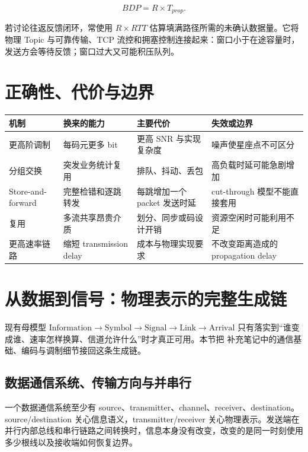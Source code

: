 \documentclass[UTF8,fontset=none,11pt,a4paper]{ctexart}
\begin{document}
\[
BDP=R\times T_{prop}.
\]

若讨论往返反馈闭环，常使用 \(R\times RTT\)
估算填满路径所需的未确认数据量。它将物理 Topic 与可靠传输、TCP
流控和拥塞控制连接起来：窗口小于在途容量时，发送方会等待反馈；窗口过大又可能积压队列。

\section{正确性、代价与边界}\label{8-ux6b63ux786eux6027ux4ee3ux4ef7ux4e0eux8fb9ux754c}

\begin{longtable}[]{@{}llll@{}}
\toprule\noalign{}
机制 & 换来的能力 & 主要代价 & 失效或边界 \\
\midrule\noalign{}
\endhead
\bottomrule\noalign{}
\endlastfoot
更高阶调制 & 每码元更多 bit & 更高 SNR 与实现复杂度 &
噪声使星座点不可区分 \\
分组交换 & 突发业务统计复用 & 排队、抖动、丢包 &
高负载时延可能急剧增加 \\
Store-and-forward & 完整检错和逐跳转发 & 每跳增加一个 packet 发送时延 &
cut-through 模型不能直接套用 \\
复用 & 多流共享昂贵介质 & 划分、同步或码设计开销 &
资源空闲时可能利用不足 \\
更高速率链路 & 缩短 transmission delay & 成本与物理实现要求 &
不改变距离造成的 propagation delay \\
\end{longtable}
\section{从数据到信号：物理表示的完整生成链}

现有母模型
\(
\text{Information}\to\text{Symbol}\to\text{Signal}\to\text{Link}\to\text{Arrival}
\)
只有落实到“谁变成谁、速率怎样换算、信道允许什么”时才真正可用。本节把 补充笔记中的通信基础、编码与调制细节接回这条生成链。

\subsection{数据通信系统、传输方向与并串行}

一个数据通信系统至少有 source、transmitter、channel、receiver、destination。source/destination 关心信息语义，transmitter/receiver 关心物理表示。发送端在并行内部总线和串行链路之间转换时，信息本身没有改变，改变的是同一时刻使用多少根线以及接收端如何恢复边界。
\end{document}
